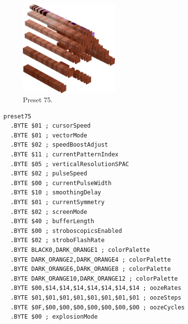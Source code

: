 \clearpage
\begin{minipage}[b]{0.48\linewidth}
\begin{figure}[H]                                                          
  \centering                                                             
  \begin{adjustbox}{width=5cm,center}                                   
  \includegraphics[width=5cm]{src/colorspace_presets/preset75-45.png}%
  \end{adjustbox}                                                        
\caption*{Preset 75.}                                           
\end{figure}                                                               
\end{minipage}
\hspace{0.1cm}
\begin{minipage}[b]{0.48\linewidth}                            
\begin{lstlisting}[basicstyle=\ttfamily\tiny]
preset75
  .BYTE $01 ; cursorSpeed
  .BYTE $01 ; vectorMode
  .BYTE $02 ; speedBoostAdjust
  .BYTE $11 ; currentPatternIndex
  .BYTE $05 ; verticalResolutionSPAC
  .BYTE $02 ; pulseSpeed
  .BYTE $00 ; currentPulseWidth
  .BYTE $10 ; smoothingDelay
  .BYTE $01 ; currentSymmetry
  .BYTE $02 ; screenMode
  .BYTE $40 ; bufferLength
  .BYTE $00 ; stroboscopicsEnabled
  .BYTE $02 ; stroboFlashRate
  .BYTE BLACK0,DARK_ORANGE1 ; colorPalette
  .BYTE DARK_ORANGE2,DARK_ORANGE4 ; colorPalette
  .BYTE DARK_ORANGE6,DARK_ORANGE8 ; colorPalette
  .BYTE DARK_ORANGE10,DARK_ORANGE12 ; colorPalette
  .BYTE $00,$14,$14,$14,$14,$14,$14,$14 ; oozeRates
  .BYTE $01,$01,$01,$01,$01,$01,$01,$01 ; oozeSteps
  .BYTE $0F,$00,$00,$00,$00,$00,$00,$00 ; oozeCycles
  .BYTE $00 ; explosionMode
\end{lstlisting}
\end{minipage}

\vspace*{-0.5cm}

